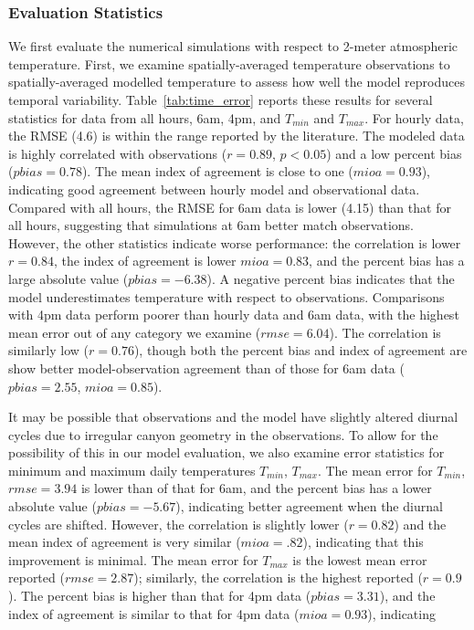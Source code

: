 \documentclass[draft,linenumbers]{agujournal}
\begin{document}
\subsubsection{Evaluation Statistics}
We first evaluate the numerical simulations with respect to 2-meter atmospheric temperature. First, we examine spatially-averaged temperature observations to spatially-averaged modelled temperature to assess how well the model reproduces temporal variability. Table~\ref{tab:time_error} reports these results for several statistics for data from all hours, 6am, 4pm, and $T_{min}$ and $T_{max}$. For hourly data, the RMSE (4.6) is within the range reported by the literature. 
The modeled data is highly correlated with observations ($r=0.89$, $p<0.05$) and a low percent bias ($pbias = 0.78$). The mean index of agreement is close to one ($mioa=0.93$), indicating good agreement between hourly model and observational data.
Compared with all hours, the RMSE for 6am data is lower (4.15) than that for all hours, suggesting that simulations at 6am better match observations. However, the other statistics indicate worse performance:  the correlation is lower $r=0.84$, the index of agreement is lower $mioa=0.83$, and the percent bias has a large absolute value ($pbias=-6.38$). A negative percent bias indicates that the model underestimates temperature with respect to observations. Comparisons with 4pm data perform poorer than hourly data and 6am data, with the highest mean error out of any category we examine ($rmse=6.04$). The correlation is similarly low ($r=0.76$), though both the percent bias and index of agreement are show better model-observation agreement than of those for 6am data ($pbias=2.55$, $mioa=0.85$).

It may be possible that observations and the model have slightly altered diurnal cycles due to irregular canyon geometry in the observations. To allow for the possibility of this in our model evaluation, we also examine error statistics for minimum and maximum daily temperatures $T_{min}$, $T_{max}$. The mean error for $T_{min}$, $rmse=3.94$ is lower than of that for 6am, and the percent bias has a lower absolute value ($pbias=-5.67$), indicating better agreement when the diurnal cycles are shifted. However, the correlation is slightly lower ($r=0.82$) and the mean index of agreement is very similar ($mioa=.82$), indicating that this improvement is minimal. The mean error for $T_{max}$ is the lowest mean error reported ($rmse=2.87$); similarly, the correlation is the highest reported ($r=0.9$). The percent bias is higher than that for 4pm data ($pbias=3.31$), and the index of agreement is similar to that for 4pm data ($mioa=0.93$), indicating 
\end{document}
